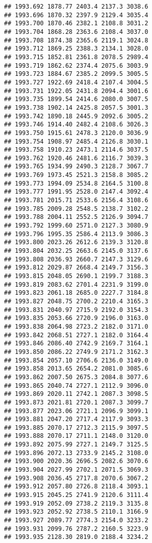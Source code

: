 \documentclass[
]{article}
\begin{document}
\begin{verbatim}
## 1993.692 1878.77 2403.4 2137.3 3038.6
## 1993.696 1870.32 2397.9 2129.4 3035.4
## 1993.700 1870.46 2382.1 2108.8 3031.2
## 1993.704 1868.28 2363.6 2108.4 3037.0
## 1993.708 1874.38 2365.6 2119.1 3024.8
## 1993.712 1869.25 2388.3 2134.1 3028.0
## 1993.715 1852.81 2361.8 2078.5 2989.4
## 1993.719 1862.62 2374.4 2075.6 3003.9
## 1993.723 1884.67 2385.2 2099.5 3005.5
## 1993.727 1922.69 2418.4 2107.4 3004.5
## 1993.731 1922.05 2431.8 2094.4 3001.6
## 1993.735 1899.54 2414.6 2080.0 3007.5
## 1993.738 1902.14 2425.8 2057.5 3001.3
## 1993.742 1890.18 2445.9 2092.6 3005.2
## 1993.746 1914.40 2482.4 2108.6 3026.3
## 1993.750 1915.61 2478.3 2120.0 3036.9
## 1993.754 1908.97 2485.4 2126.8 3030.1
## 1993.758 1910.23 2473.1 2114.6 3037.5
## 1993.762 1920.46 2481.6 2116.7 3039.3
## 1993.765 1934.99 2490.3 2128.7 3067.7
## 1993.769 1973.45 2521.3 2158.8 3085.2
## 1993.773 1994.09 2534.8 2164.5 3100.8
## 1993.777 1991.95 2528.0 2147.4 3092.4
## 1993.781 2015.71 2533.6 2156.4 3108.6
## 1993.785 2009.28 2548.5 2138.7 3102.2
## 1993.788 2004.11 2552.5 2126.9 3094.7
## 1993.792 1999.60 2571.0 2127.3 3080.9
## 1993.796 1995.35 2586.4 2113.9 3086.3
## 1993.800 2023.26 2612.6 2139.3 3120.8
## 1993.804 2032.25 2663.6 2145.0 3137.6
## 1993.808 2036.93 2660.7 2147.3 3129.6
## 1993.812 2029.87 2668.4 2149.7 3156.3
## 1993.815 2048.05 2690.1 2199.7 3188.3
## 1993.819 2083.62 2701.4 2231.9 3199.0
## 1993.823 2061.18 2685.0 2227.7 3184.8
## 1993.827 2048.75 2700.2 2210.4 3165.3
## 1993.831 2040.97 2715.9 2192.0 3154.3
## 1993.835 2053.66 2720.9 2196.0 3163.0
## 1993.838 2064.98 2723.2 2182.0 3171.0
## 1993.842 2068.51 2727.1 2182.0 3164.4
## 1993.846 2086.40 2742.9 2169.7 3164.1
## 1993.850 2086.22 2749.9 2171.2 3162.3
## 1993.854 2057.10 2706.6 2136.0 3149.0
## 1993.858 2013.65 2654.2 2081.0 3085.6
## 1993.862 2007.50 2675.3 2084.8 3077.6
## 1993.865 2040.74 2727.1 2112.9 3096.0
## 1993.869 2020.11 2742.1 2087.3 3098.5
## 1993.873 2021.81 2720.1 2087.3 3099.7
## 1993.877 2023.06 2721.1 2096.9 3099.1
## 1993.881 2047.20 2717.4 2117.9 3093.3
## 1993.885 2070.17 2712.3 2115.9 3097.5
## 1993.888 2070.17 2711.1 2148.0 3120.0
## 1993.892 2075.99 2727.1 2149.7 3125.5
## 1993.896 2072.13 2733.9 2145.2 3108.0
## 1993.900 2020.36 2696.5 2082.6 3070.6
## 1993.904 2027.99 2702.1 2071.5 3069.3
## 1993.908 2036.45 2717.8 2070.6 3067.2
## 1993.912 2057.80 2726.8 2118.4 3093.1
## 1993.915 2045.25 2741.9 2120.6 3111.4
## 1993.919 2052.09 2738.2 2119.3 3135.8
## 1993.923 2052.92 2738.5 2110.1 3166.9
## 1993.927 2089.77 2774.3 2154.0 3233.2
## 1993.931 2099.76 2787.2 2160.5 3223.9
## 1993.935 2128.30 2819.0 2188.4 3234.2

\end{verbatim}
\end{document}
